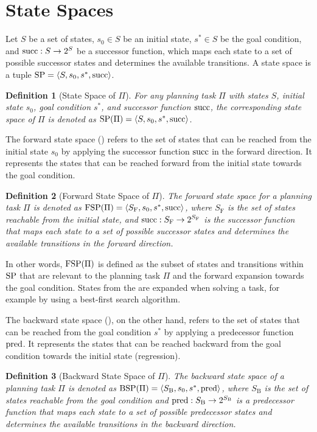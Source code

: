 \documentclass[ppgc,diss,english]{iiufrgs}
\newtheorem{definition}{Definition}
\begin{document}
\section{State Spaces}
\label{background-state-spaces}
Let $S$ be a set of states, $s_0 \in S$ be an initial state, $s^{*} \in S$ be the goal condition, and $\operatorname{succ} : S \to 2^S$ be a successor function, which maps each state to a set of possible successor states and determines the available transitions. A state space is a tuple ${\text{SP}}=\langle S, s_0, s^{*}, \operatorname{succ} \rangle$.
\begin{definition}[State Space of $\Pi$]
For any planning task $\Pi$ with states $S$, initial state $s_0$, goal condition $s^{*}$, and successor function $\operatorname{succ}$, the corresponding state space of $\Pi$ is denoted as ${\text{SP}}(\Pi) = \langle S, s_0, s^{*}, \operatorname{succ} \rangle$.
\end{definition}

The forward state space (\fsp) refers to the set of states that can be reached from the initial state $s_0$ by applying the successor function $\operatorname{succ}$ in the forward direction. It represents the states that can be reached forward from the initial state towards the goal condition.

\begin{definition}[Forward State Space of $\Pi$]
The forward state space for a planning task $\Pi$ is denoted as ${\text{FSP}}(\Pi) = \langle S_{\text{F}}, s_0, s^{*}, \operatorname{succ} \rangle$, where $S_{\text{F}}$ is the set of states reachable from the initial state, and $\operatorname{succ} : S_{\text{F}} \to 2^{S_{\text{F}}}$ is the successor function that maps each state to a set of possible successor states and determines the available transitions in the forward direction.
\end{definition}

In other words, ${\text{FSP}}(\Pi)$ is defined as the subset of states and transitions within ${\text{SP}}$ that are relevant to the planning task $\Pi$ and the forward expansion towards the goal condition. States from the \fsp are expanded when solving a task, for example by using a best-first search algorithm.

The backward state space (\bsp), on the other hand, refers to the set of states that can be reached from the goal condition $s^{*}$ by applying a predecessor function $\operatorname{pred}$. It represents the states that can be reached backward from the goal condition towards the initial state (regression).

\begin{definition}[Backward State Space of $\Pi$]
The backward state space of a planning task $\Pi$ is denoted as ${\text{BSP}}(\Pi) = \langle S_{\text{B}}, s_{0}, s^{*}, \operatorname{pred} \rangle$, where $S_{\text{B}}$ is the set of states reachable from the goal condition and $\operatorname{pred} : S_{\text{B}} \to 2^{S_{\text{B}}}$ is a predecessor function that maps each state to a set of possible predecessor states and determines the available transitions in the backward direction.
\end{definition}
\end{document}
